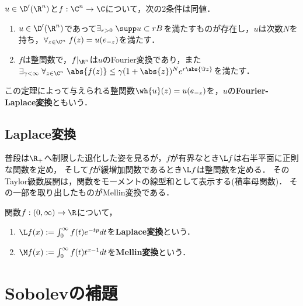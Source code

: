 \documentclass[uplatex,dvipdfmx]{jsreport}
\begin{document}
\begin{theorem}
    $u\in\D'(\R^n)$と$f:\C^n\to\C$について，次の2条件は同値．
    \begin{enumerate}
        \item $u\in\D'(\R^n)$であって$\exists_{r>0}\;\supp u\subset rB$を満たすものが存在し，$u$は次数$N$を持ち，$\forall_{z\in\C^n}\;f(z)=u(e_{-z})$を満たす．
        \item $f$は整関数で，$f|_{\R^n}$は$u$のFourier変換であり，また$\exists_{\gamma<\infty}\;\forall_{z\in\C^n}\;\abs{f(z)}\le\gamma(1+\abs{z})^Ne^{r\abs{\Im z}}$を満たす．
    \end{enumerate}
\end{theorem}

\begin{definition}
    この定理によって与えられる整関数$\wh{u}(z)=u(e_{-z})$を，$u$の\textbf{Fourier-Laplace変換}ともいう．
\end{definition}

\subsection{Laplace変換}

\begin{tcolorbox}[colframe=ForestGreen, colback=ForestGreen!10!white,breakable,colbacktitle=ForestGreen!40!white,coltitle=black,fonttitle=\bfseries\sffamily,
title=]
    普段は$\R_+$へ制限した退化した姿を見るが，$f$が有界なとき$\L f$は右半平面に正則な関数を定め，
    そして$f$が緩増加関数であるとき$\L f$は整関数を定める．
    そのTaylor級数展開は，関数をモーメントの線型和として表示する(積率母関数)．
    その一部を取り出したものがMellin変換である．
\end{tcolorbox}

\begin{definition}
    関数$f:(0,\infty)\to\R$について，
    \begin{enumerate}
        \item $\L f(x):=\int^\infty_0f(t)e^{-tp}dt$を\textbf{Laplace変換}という．
        \item $\M f(x):=\int^\infty_0f(t)t^{x-1}dt$を\textbf{Mellin変換}という．
    \end{enumerate}
\end{definition}

\section{Sobolevの補題}
\end{document}
